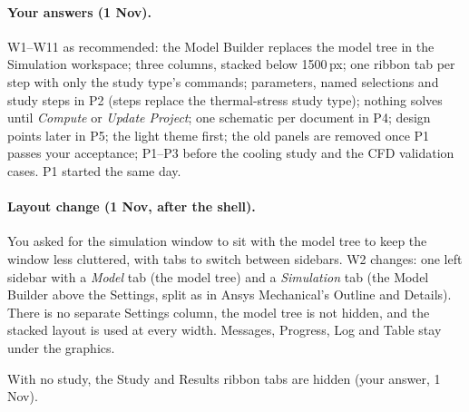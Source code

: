 \paragraph{Your answers (1 Nov).} W1--W11 as recommended: the Model Builder replaces the model tree in the Simulation
workspace; three columns, stacked below 1500\,px; one ribbon tab per step with only the study type's commands; parameters,
named selections and study steps in P2 (steps replace the thermal-stress study type); nothing solves until \emph{Compute}
or \emph{Update Project}; one schematic per document in P4; design points later in P5; the light theme first; the old
panels are removed once P1 passes your acceptance; P1--P3 before the cooling study and the CFD validation cases.
P1 started the same day.


\paragraph{Layout change (1 Nov, after the shell).} You asked for the simulation window to sit with the model tree to
keep the window less cluttered, with tabs to switch between sidebars. W2 changes: one left sidebar with a \emph{Model}
tab (the model tree) and a \emph{Simulation} tab (the Model Builder above the Settings, split as in Ansys Mechanical's
Outline and Details). There is no separate Settings column, the model tree is not hidden, and the stacked layout is used
at every width. Messages, Progress, Log and Table stay under the graphics.

With no study, the Study and Results ribbon tabs are hidden (your answer, 1 Nov).
